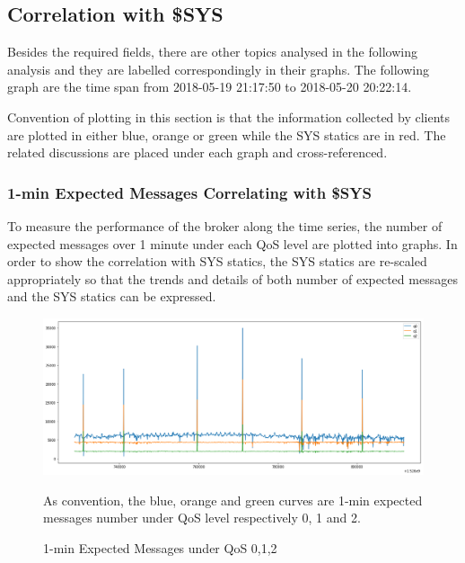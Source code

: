\documentclass[12pt, letterpaper]{article}
\begin{document}
\subsection{Correlation with \$SYS}

Besides the required fields, there are other topics analysed in the following analysis and they are labelled correspondingly in their graphs. The following graph are the time span from 2018-05-19 21:17:50 to 2018-05-20 20:22:14.

Convention of plotting in this section is that the information collected by clients are plotted in either blue, orange or green while the SYS statics are in red. The related discussions are placed under each graph and cross-referenced.

\subsubsection{1-min Expected Messages Correlating with \$SYS}
\label{s:1min_expected_msg}

To measure the performance of the broker along the time series, the number of expected messages over 1 minute under each QoS level are plotted into graphs. In order to show the correlation with SYS statics, the SYS statics are re-scaled appropriately so that the trends and details of both number of expected messages and the SYS statics can be expressed. 

\FloatBarrier
\begin{figure}
	\setlength{\tabcolsep}{0pt}
	\caption{1-min Expected Messages under QoS 0,1,2}
	\label{f:valid_cnt}
	\begin{center}
	
		\includegraphics[width=\textwidth]{valid_cnt/valid_cnt}	
	
	\end{center}
	As convention, the blue, orange and green curves are 1-min expected messages number under QoS level respectively 0, 1 and 2.
\end{figure}
\end{document}
